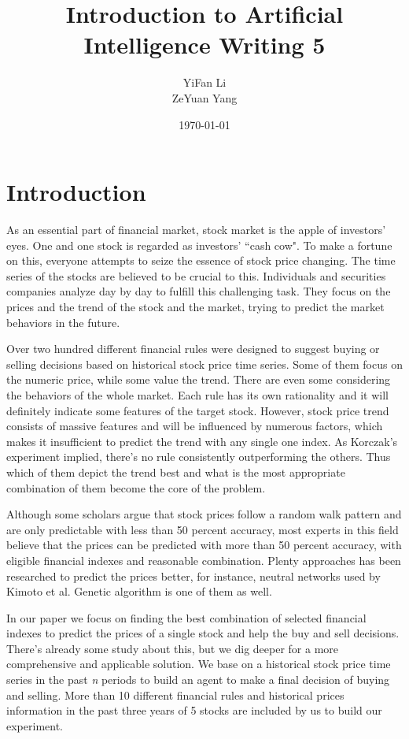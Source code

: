 \documentclass{article}
\title{Introduction to Artificial Intelligence Writing 5}
\author{YiFan Li\\ZeYuan Yang}
\date{\today}
\begin{document}
\maketitle
{}



\section{Introduction}

As an essential part of financial market, stock market is the apple of investors' eyes.
One and one stock is regarded as investors' ``cash cow".
To make a fortune on this, everyone attempts to seize the essence of stock price changing.
The time series of the stocks are believed to be crucial to this.
Individuals and securities companies analyze day by day to fulfill this challenging task.
They focus on the prices and the trend of the stock and the market,
trying to predict the market behaviors in the future.

Over two hundred different financial rules were designed to
suggest buying or selling decisions based on historical stock price time series. \cite{stock-timing-using-genetic-algorithms}
Some of them focus on the numeric price, while some value the trend.
There are even some considering the behaviors of the whole market.
Each rule has its own rationality and it will definitely indicate some features of the target stock.
However, stock price trend consists of massive features and will be influenced by numerous factors,
which makes it insufficient to predict the trend with any single one index.
As Korczak's experiment implied, there's no rule consistently outperforming the others. \cite{korczak2002stock}
Thus which of them depict the trend best and what is the most appropriate combination of them become the core of the problem.

Although some scholars argue that stock prices follow a random walk pattern
and are only predictable with less than 50 percent accuracy,
most experts in this field believe that the prices can be predicted with more than 50 percent accuracy,
with eligible financial indexes and reasonable combination. \cite{Qian2007}
Plenty approaches has been researched to predict the prices better,
for instance, neutral networks used by Kimoto et al. \cite{5726498}
Genetic algorithm is one of them as well.

In our paper we focus on finding the best combination of selected financial indexes
to predict the prices of a single stock and help the buy and sell decisions.
There's already some study about this, but we dig deeper for a more comprehensive and applicable solution.
\cite{genetic-algorithms-for-predicting-the-egyptian-stock-market}
\cite{genetic-algorithms-to-optimise-the-time-to-make-stock-market-investment}
We base on a historical stock price time series in the past \emph{n} periods
to build an agent to make a final decision of buying and selling.
More than 10 different financial rules and historical prices information
in the past three years of 5 stocks are included by us to build our experiment.
\end{document}
